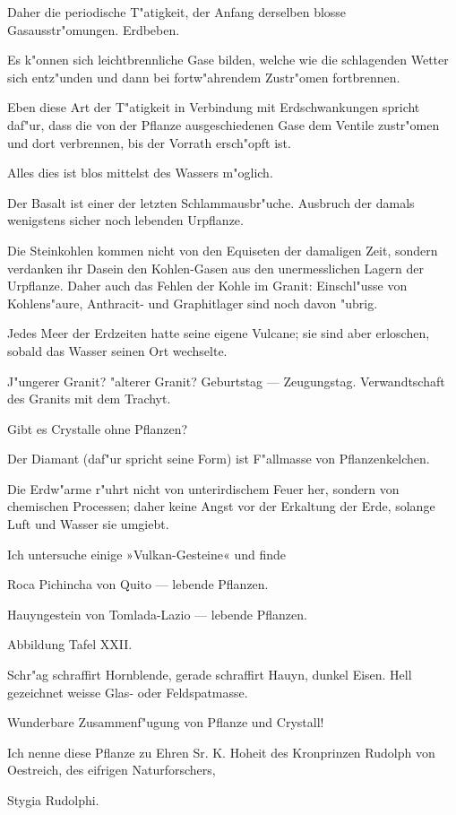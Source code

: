 \documentclass[a4paper, 11pt, oneside, german]{article}
\begin{document}
Daher die periodische T"atigkeit, der Anfang derselben blosse Gasausstr"omungen. Erdbeben.

Es k"onnen sich leichtbrennliche Gase bilden, welche wie die schlagenden Wetter sich entz"unden und dann bei fortw"ahrendem Zustr"omen fortbrennen.

Eben diese Art der T"atigkeit in Verbindung mit Erdschwankungen spricht daf"ur, dass die von der Pflanze ausgeschiedenen Gase dem Ventile zustr"omen und dort verbrennen, bis der Vorrath ersch"opft ist.

Alles dies ist blos mittelst des Wassers m"oglich.

Der Basalt ist einer der letzten Schlammausbr"uche. Ausbruch der damals wenigstens sicher noch lebenden Urpflanze.

Die Steinkohlen kommen nicht von den Equiseten der damaligen Zeit, sondern verdanken ihr Dasein den Kohlen-Gasen aus den unermesslichen Lagern der Urpflanze. Daher auch das Fehlen der Kohle im Granit: Einschl"usse von Kohlens"aure, Anthracit- und Graphitlager sind noch davon "ubrig.

Jedes Meer der Erdzeiten hatte seine eigene Vulcane; sie sind aber erloschen, sobald das Wasser seinen Ort wechselte.

J"ungerer Granit? "alterer Granit? Geburtstag --- Zeugungstag. Verwandtschaft des Granits mit dem Trachyt.

Gibt es Crystalle ohne Pflanzen?

Der Diamant (daf"ur spricht seine Form) ist F"allmasse von Pflanzenkelchen.

Die Erdw"arme r"uhrt nicht von unterirdischem Feuer her, sondern von chemischen Processen; daher keine Angst vor der Erkaltung der Erde, solange Luft und Wasser sie umgiebt.

Ich untersuche einige »Vulkan-Gesteine« und finde

Roca Pichincha von Quito --- lebende Pflanzen.

Hauyngestein von Tomlada-Lazio --- lebende Pflanzen.

Abbildung Tafel XXII.

Schr"ag schraffirt Hornblende, gerade schraffirt Hauyn, dunkel Eisen. Hell gezeichnet weisse Glas- oder Feldspatmasse.

Wunderbare Zusammenf"ugung von Pflanze und Crystall!

Ich nenne diese Pflanze zu Ehren Sr. K. Hoheit des Kronprinzen Rudolph von Oestreich, des eifrigen Naturforschers,

Stygia Rudolphi.
\end{document}
